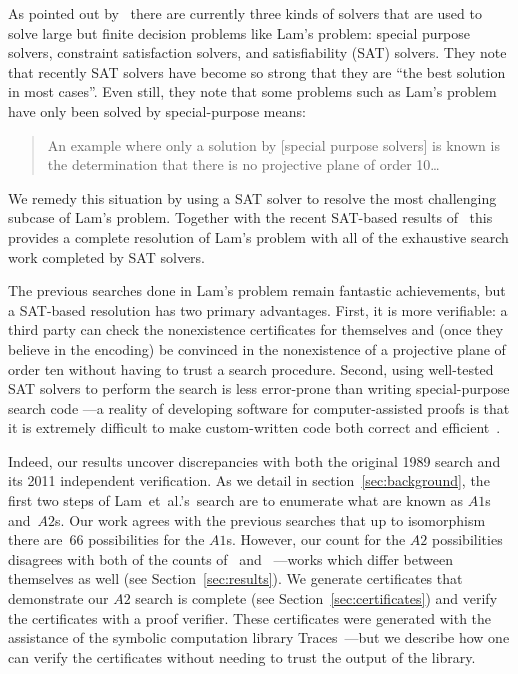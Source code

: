 \documentclass[letterpaper]{article}
\begin{document}
As pointed out by~\cite{heule2017solving} there are currently
three kinds of solvers that are used to solve large but finite
decision problems like Lam's problem: special purpose solvers, constraint
satisfaction solvers, and satisfiability (SAT) solvers.  They note that
recently SAT solvers have become so strong that they are ``the best solution
in most cases''.  Even still, they note that some problems such as
Lam's problem have only been solved by special-purpose means:
\begin{quote}
An example where only a solution by [special purpose solvers]
is known is the determination that there is no projective plane of order 10\dots
\end{quote}
We remedy this situation by using a SAT solver to resolve
the most challenging subcase of Lam's problem.  Together with the recent SAT-based
results of~\cite{bright2020nonexistence,bright2020unsatisfiability} this provides
a complete resolution of Lam's problem with all
of the exhaustive search work completed by SAT solvers.

The previous searches done in Lam's problem remain fantastic achievements, but
a SAT-based resolution has two primary advantages.  First, it is more verifiable:
a third party can check the nonexistence certificates for themselves and (once
they believe in the encoding) be convinced in the nonexistence of a projective plane
of order ten without having to trust a search procedure.
Second,
using well-tested SAT solvers to perform the
search is less error-prone than writing special-purpose search code%
---a reality of developing software for computer-assisted proofs
is that it is extremely difficult to make custom-written code
both correct and efficient~\cite{lam1990reliable}.

Indeed, our results uncover discrepancies with both the original
1989 search and its 2011 independent verification.  As we detail in
section~\ref{sec:background}, the first two steps of Lam~et~al.'s~search are to enumerate
what
are known as $A1$s and~$A2$s.  Our work agrees with
the previous searches that up to isomorphism there are~66 possibilities
for the $A1$s.  However, our count for the $A2$ possibilities disagrees with
both of the counts of~\cite{lam1989non} and~\cite{roy2011confirmation}%
---works which differ between themselves as well (see Section~\ref{sec:results}).
We generate certificates that demonstrate our $A2$ search is complete
(see Section~\ref{sec:certificates}) and verify the certificates
with a proof verifier.  These certificates were generated
with the assistance of the symbolic computation library
Traces~\cite{McKay201494}---but we describe how one can verify
the certificates without needing to trust the output of the library.
\end{document}
